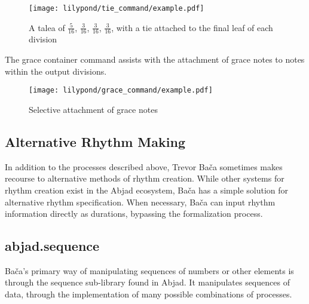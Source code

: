 \begin{figure}[H]
    \texttt{[image: lilypond/tie\_command/example.pdf]}
    \caption{A talea of $\frac{5}{16}$, $\frac{3}{16}$, $\frac{3}{16}$, $\frac{3}{16}$, with a tie attached to the final leaf of each division}
    \label{fig:tie}
\end{figure}

The grace container command assists with the attachment of grace notes to notes within the output divisions.


\begin{figure}[H]
    \texttt{[image: lilypond/grace\_command/example.pdf]}
    \caption{Selective attachment of grace notes}
    \label{fig:grace}
\end{figure}

\subsection{Alternative Rhythm Making}

In addition to the processes described above, Trevor Ba\v{c}a sometimes makes recourse to alternative methods of rhythm creation. While other systems for rhythm creation exist in the Abjad ecosystem, Ba\v{c}a has a simple solution for alternative rhythm specification. When necessary, Ba\v{c}a can input rhythm information directly as durations, bypassing the formalization process.

\subsection{abjad.sequence}

Bača's primary way of manipulating sequences of numbers or other elements is through the sequence sub-library found in Abjad. It manipulates sequences of data, through the implementation of many possible combinations of processes.

